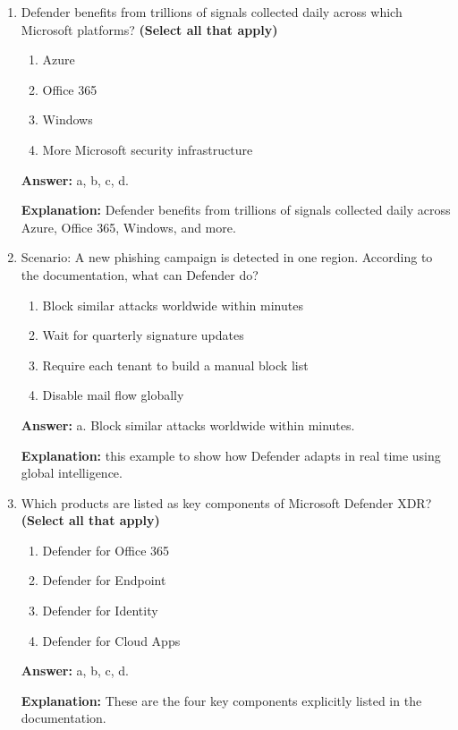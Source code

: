 \documentclass[10pt]{article}
\begin{document}
\begin{enumerate}[leftmargin=*]
\textbf{Explanation:} post-breach capabilities are critical because attackers often use multi-stage campaigns.

\item Defender benefits from trillions of signals collected daily across which Microsoft platforms? \textbf{(Select all that apply)}
\begin{enumerate}[label=\alph*., leftmargin=1.5em]
\item Azure
\item Office 365
\item Windows
\item More Microsoft security infrastructure
\end{enumerate}
\textbf{Answer:} a, b, c, d.

\textbf{Explanation:} Defender benefits from trillions of signals collected daily across Azure, Office 365, Windows, and more.

\item Scenario: A new phishing campaign is detected in one region. According to the documentation, what can Defender do?
\begin{enumerate}[label=\alph*., leftmargin=1.5em]
\item Block similar attacks worldwide within minutes
\item Wait for quarterly signature updates
\item Require each tenant to build a manual block list
\item Disable mail flow globally
\end{enumerate}
\textbf{Answer:} a. Block similar attacks worldwide within minutes.

\textbf{Explanation:} this example to show how Defender adapts in real time using global intelligence.

\item Which products are listed as key components of Microsoft Defender XDR? \textbf{(Select all that apply)}
\begin{enumerate}[label=\alph*., leftmargin=1.5em]
\item Defender for Office 365
\item Defender for Endpoint
\item Defender for Identity
\item Defender for Cloud Apps
\end{enumerate}
\textbf{Answer:} a, b, c, d.

\textbf{Explanation:} These are the four key components explicitly listed in the documentation.


\end{enumerate}
\end{document}

